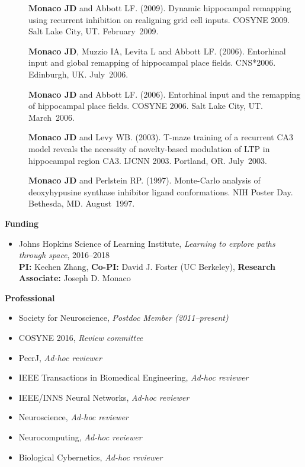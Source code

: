\documentclass[10pt]{article}
\begin{document}
\begin{description}
\item[\quad] \textbf{Monaco JD} and Abbott LF. (2009). Dynamic hippocampal remapping using recurrent inhibition on realigning grid cell inputs. COSYNE 2009. Salt Lake City, UT. February~2009.
\item[\quad] \textbf{Monaco JD}, Muzzio IA, Levita L and Abbott LF. (2006). Entorhinal input and global remapping of hippocampal place fields. CNS*2006. Edinburgh, UK. July~2006.
\item[\quad] \textbf{Monaco JD} and Abbott LF. (2006). Entorhinal input and the remapping of hippocampal place fields. COSYNE 2006. Salt Lake City, UT. March~2006.
\item[\quad] \textbf{Monaco JD} and Levy WB. (2003). T-maze training of a recurrent CA3 model reveals the necessity of novelty-based modulation of LTP in hippocampal region CA3. IJCNN 2003. Portland, OR. July~2003.
\item[\quad] \textbf{Monaco JD} and Perlstein RP. (1997). Monte-Carlo analysis of deoxyhypusine synthase inhibitor ligand conformations. NIH Poster Day. Bethesda, MD. August~1997. 
\end{description}

{\large \textbf{Funding}}
\begin{itemize}
  \item Johns Hopkins Science of Learning Institute, \emph{Learning to explore paths through space}, 2016--2018 \\
    \textbf{PI:} Kechen Zhang, \textbf{Co-PI:} David J. Foster (UC Berkeley), \textbf{Research Associate:} Joseph D. Monaco
\end{itemize}

{\large \textbf{Professional}}
\begin{itemize}
  \item Society for Neuroscience, \emph{Postdoc Member (2011--present)}
  \item COSYNE 2016, \emph{Review committee}
  \item PeerJ, \emph{Ad-hoc reviewer}
  \item IEEE Transactions in Biomedical Engineering, \emph{Ad-hoc reviewer}
  \item IEEE/INNS Neural Networks, \emph{Ad-hoc reviewer}
  \item Neuroscience, \emph{Ad-hoc reviewer}
  \item Neurocomputing, \emph{Ad-hoc reviewer}
  \item Biological Cybernetics, \emph{Ad-hoc reviewer}
\end{itemize}
  
\end{document}
